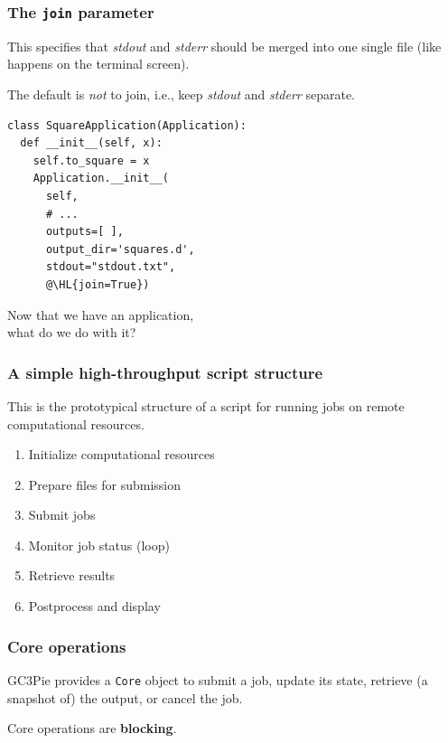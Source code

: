 \documentclass[english,serif,mathserif,xcolor=pdftex,dvipsnames,table]{beamer}
\begin{document}
\begin{frame}[fragile]
\frametitle{The \texttt{join} parameter}

This specifies that \emph{stdout} and \emph{stderr} should be merged
into one single file (like happens on the terminal screen).

\+
The default is \emph{not} to join, i.e., keep \emph{stdout} and \emph{stderr} separate.

\+
\begin{lstlisting}
class SquareApplication(Application):
  def __init__(self, x):
    self.to_square = x
    Application.__init__(
      self,
      # ...
      outputs=[ ],
      output_dir='squares.d',
      stdout="stdout.txt",
      @\HL{join=True})
\end{lstlisting}
\end{frame}


\begin{frame}
  \begin{center}
    Now that we have an application,
    \\
    what do we do with it?
  \end{center}
\end{frame}


\begin{frame}
\frametitle{A simple high-throughput script structure}

This is the prototypical structure of a script for running jobs on
remote computational resources.

\+
\begin{enumerate}
\item Initialize computational resources
\item Prepare files for submission
\item Submit jobs
\item Monitor job status (loop)
\item Retrieve results
\item Postprocess and display
\end{enumerate}
\end{frame}


\begin{frame}[fragile]
\frametitle{Core operations}

GC3Pie provides a \texttt{Core} object to submit a job, update its
state, retrieve (a snapshot of) the output, or cancel the job.

\+
Core operations are \textbf{blocking}.

\end{frame}
\end{document}
